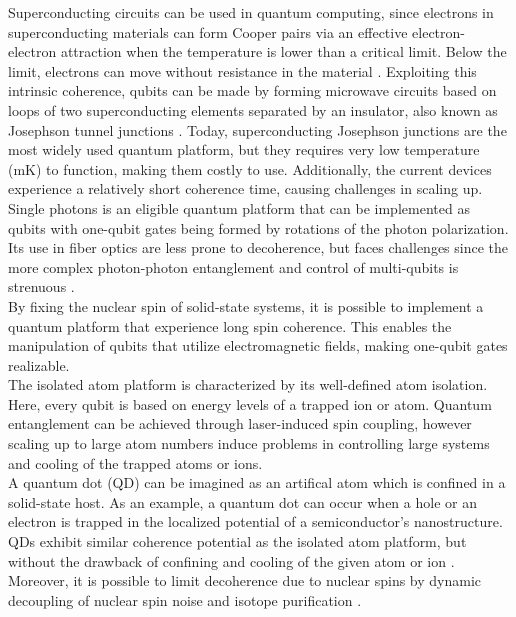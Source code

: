 Superconducting circuits can be used in quantum computing, since electrons in superconducting materials can form Cooper pairs via an effective electron-electron attraction when the temperature is lower than a critical limit. Below the limit, electrons can move without resistance in the material \cite{KristianFossheim2004}. Exploiting this intrinsic coherence, qubits can be made by forming microwave circuits based on loops of two superconducting elements separated by an insulator, also known as Josephson tunnel junctions \cite{Acin2018}. Today, superconducting Josephson junctions are the most widely used quantum platform, but they requires very low temperature (mK) to function, making them costly to use. Additionally, the current devices experience a relatively short coherence time, causing challenges in scaling up. \\

Single photons is an eligible quantum platform that can be implemented as qubits with one-qubit gates being formed by rotations of the photon polarization. Its use in fiber optics are less prone to decoherence, but faces challenges since the more complex photon-photon entanglement and control of multi-qubits is strenuous \cite{Ladd2010}. \\

By fixing the nuclear spin of solid-state systems, it is possible to implement a quantum platform that experience long spin coherence. This enables the manipulation of qubits that utilize electromagnetic fields, making one-qubit gates realizable. \\

The isolated atom platform is characterized by its well-defined atom isolation. Here, every qubit is based on energy levels of a trapped ion or atom. Quantum entanglement can be achieved through laser-induced spin coupling, however scaling up to large atom numbers induce problems in controlling large systems and cooling of the trapped atoms or ions. \\

A quantum dot (QD) can be imagined as an artifical atom which is confined in a solid-state host. As an example, a quantum dot can occur when a hole or an electron is trapped in the localized potential of a semiconductor's nanostructure. QDs exhibit similar coherence potential as the isolated atom platform, but without the drawback of confining and cooling of the given atom or ion \cite{Acin2018}. Moreover, it is possible to limit decoherence due to nuclear spins by dynamic decoupling of nuclear spin noise and isotope purification \cite{Ladd2010}.

